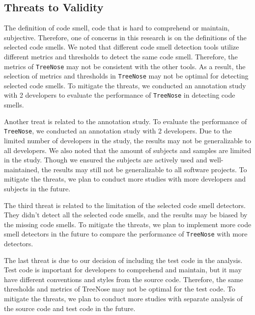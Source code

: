 




\subsection{Threats to Validity}
\label{sec:threats-to-validity}

The definition of code smell, code that is hard to comprehend or maintain, subjective. Therefore, one of concerns in this research is on the
definitions of the selected code smells. We noted that different code smell detection tools utilize 
different metrics and thresholds to detect the same code smell. Therefore, the metrics of \texttt{TreeNose} may not be consistent with the other tools.
As a result, the selection of metrics and thresholds in \texttt{TreeNose} may not be optimal for detecting selected code smells.
To mitigate the threats, we conducted an annotation study with 2 developers to evaluate the performance of \texttt{TreeNose} in detecting code smells.

Another treat is related to the annotation study. To evaluate the performance of \texttt{TreeNose},
we conducted an annotation study with 2 developers. Due to the limited number of developers in the study, the results may not be 
generalizable to all developers. We also noted that the amount of subjects and samples are limited in the study. Though we ensured the subjects are actively used and well-maintained, 
the results may still not be generalizable to all software projects. 
To mitigate the threats, we plan to conduct more studies with more developers and subjects in the future.

The third threat is related to the limitation of the selected code smell detectors. They didn't detect all the selected code smells,
and the results may be biased by the missing code smells. To mitigate the threats, 
we plan to implement more code smell detectors in the future to compare the performance of \texttt{TreeNose} with more detectors.

The last threat is due to our decision of including the test code in the analysis. Test code is important for developers to comprehend and maintain,
but it may have different conventions and styles from the source code. Therefore, the same thresholds and metrics of TreeNose may not be optimal for the test code.
To mitigate the threats, we plan to conduct more studies with separate analysis of the source code and test code in the future.


